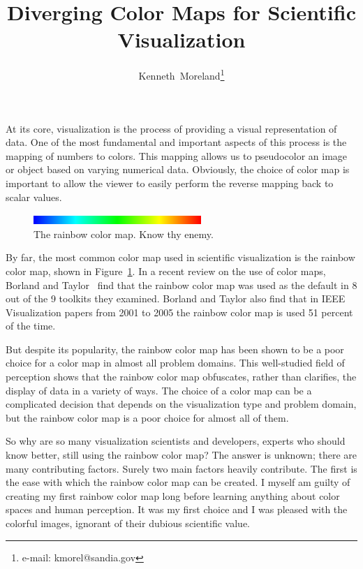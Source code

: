 \documentclass{vgtc}                          %
\title{Diverging Color Maps for Scientific Visualization}
\author{Kenneth~Moreland\thanks{e-mail: kmorel@sandia.gov}}
\affiliation{\scriptsize Sandia National Laboratories}
\newcommand{\scite}[1]{~\cite{#1}}
\begin{document}

\maketitle

\label{sec:Introduction}

At its core, visualization is the process of providing a visual
representation of data.  One of the most fundamental and important aspects
of this process is the mapping of numbers to colors.  This mapping allows
us to pseudocolor an image or object based on varying numerical data.
Obviously, the choice of color map is important to allow the viewer to
easily perform the reverse mapping back to scalar values.

\begin{figure}
  \centering
  \includegraphics[width=2.5in]{images/RainbowBar}
  \caption{The rainbow color map.  Know thy enemy.}
  \label{fig:RainbowColorMap}
\end{figure}

By far, the most common color map used in scientific visualization is the
rainbow color map, shown in Figure~\ref{fig:RainbowColorMap}.  In a recent
review on the use of color maps, Borland and Taylor\scite{Borland07} find
that the rainbow color map was used as the default in 8 out of the 9
toolkits they examined.  Borland and Taylor also find that in IEEE
Visualization papers from 2001 to 2005 the rainbow color map is used 51
percent of the time.

But despite its popularity, the rainbow color map has been shown to be a
poor choice for a color map in almost all problem domains.  This
well-studied field of perception shows that the rainbow color map obfuscates,
rather than clarifies, the display of data in a variety of ways.  The
choice of a color map can be a complicated decision that depends on
the visualization type and problem domain, but the rainbow color map is a
poor choice for almost all of them.

So why are so many visualization scientists and developers, experts who
should know better, still using the rainbow color map?  The answer is
unknown; there are many contributing factors.  Surely two main factors
heavily contribute.  The first is the ease with which the rainbow color map
can be created.  I myself am guilty of creating my first rainbow color map
long before learning anything about color spaces and human perception.  It
was my first choice and I was pleased with the colorful images, ignorant of
their dubious scientific value.
\end{document}
